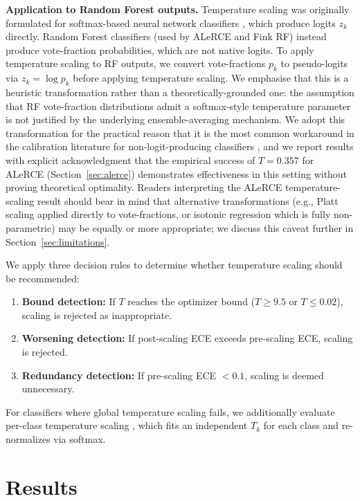\documentclass[twocolumn]{aastex631}
\begin{document}
\textbf{Application to Random Forest outputs.} Temperature scaling was
originally formulated for softmax-based neural network classifiers
\citep{guo2017}, which produce logits $z_k$ directly. Random Forest
classifiers (used by ALeRCE and Fink RF) instead produce vote-fraction
probabilities, which are not native logits. To apply temperature scaling
to RF outputs, we convert vote-fractions $p_k$ to pseudo-logits via
$z_k = \log p_k$ before applying temperature scaling. We emphasise that
this is a heuristic transformation rather than a theoretically-grounded
one: the assumption that RF vote-fraction distributions admit a
softmax-style temperature parameter is not justified by the underlying
ensemble-averaging mechanism. We adopt this transformation for the
practical reason that it is the most common workaround in the calibration
literature for non-logit-producing classifiers \citep{niculescumizil2005},
and we report results with explicit acknowledgment that the empirical
success of $T = 0.357$ for ALeRCE (Section~\ref{sec:alerce}) demonstrates
effectiveness in this setting without proving theoretical optimality.
Readers interpreting the ALeRCE temperature-scaling result should bear in
mind that alternative transformations (e.g., Platt scaling applied directly
to vote-fractions, or isotonic regression which is
fully non-parametric) may be equally or more appropriate; we discuss this
caveat further in Section~\ref{sec:limitations}.

We apply three decision rules to determine whether temperature scaling should be recommended:
\begin{enumerate}
    \item \textbf{Bound detection:} If $T$ reaches the optimizer bound ($T \geq 9.5$ or $T \leq 0.02$), scaling is rejected as inappropriate.
    \item \textbf{Worsening detection:} If post-scaling ECE exceeds pre-scaling ECE, scaling is rejected.
    \item \textbf{Redundancy detection:} If pre-scaling ECE $< 0.1$, scaling is deemed unnecessary.
\end{enumerate}

For classifiers where global temperature scaling fails, we additionally evaluate per-class temperature scaling \citep{fang2020}, which fits an independent $T_k$ for each class and re-normalizes via softmax.


\section{Results} \label{sec:results}
\end{document}
